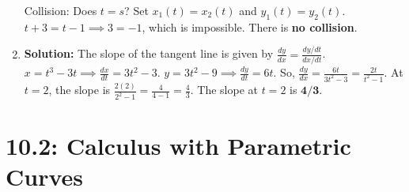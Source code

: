 \documentclass{article}
\begin{document}
\begin{enumerate}
Collision: Does $t=s$? Set $x_1(t)=x_2(t)$ and $y_1(t)=y_2(t)$.
$t+3 = t-1 \implies 3 = -1$, which is impossible.
There is \textbf{no collision}.

\item \textbf{Solution:} The slope of the tangent line is given by $\frac{dy}{dx} = \frac{dy/dt}{dx/dt}$.
$x = t^3 - 3t \implies \frac{dx}{dt} = 3t^2 - 3$.
$y = 3t^2 - 9 \implies \frac{dy}{dt} = 6t$.
So, $\frac{dy}{dx} = \frac{6t}{3t^2 - 3} = \frac{2t}{t^2-1}$.
At $t=2$, the slope is $\frac{2(2)}{2^2-1} = \frac{4}{4-1} = \frac{4}{3}$.
The slope at $t=2$ is $\mathbf{4/3}$.
\end{enumerate}

\part*{10.2: Calculus with Parametric Curves}
\end{document}
